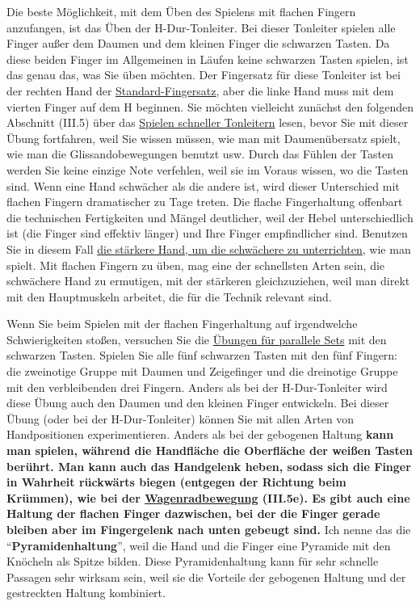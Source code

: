 Die beste Möglichkeit, mit dem Üben des Spielens mit flachen Fingern anzufangen, ist das Üben der H-Dur-Tonleiter.
Bei dieser Tonleiter spielen alle Finger außer dem Daumen und dem kleinen Finger die schwarzen Tasten.
Da diese beiden Finger im Allgemeinen in Läufen keine schwarzen Tasten spielen, ist das genau das, was Sie üben möchten.
Der Fingersatz für diese Tonleiter ist bei der rechten Hand der \hyperref[table]{Standard-Fingersatz}, aber die linke Hand muss mit dem vierten Finger auf dem H beginnen.
Sie möchten vielleicht zunächst den folgenden Abschnitt (III.5) über das \hyperref[c1iii5]{Spielen schneller Tonleitern} lesen, bevor Sie mit dieser Übung fortfahren, weil Sie wissen müssen, wie man mit Daumenübersatz spielt, wie man die Glissandobewegungen benutzt usw.
Durch das Fühlen der Tasten werden Sie keine einzige Note verfehlen, weil sie im Voraus wissen, wo die Tasten sind.
Wenn eine Hand schwächer als die andere ist, wird dieser Unterschied mit flachen Fingern dramatischer zu Tage treten. Die flache Fingerhaltung offenbart die technischen Fertigkeiten und Mängel deutlicher, weil der Hebel unterschiedlich ist (die Finger sind effektiv länger) und Ihre Finger empfindlicher sind.
Benutzen Sie in diesem Fall \hyperref[c1ii20]{die stärkere Hand, um die schwächere zu unterrichten}, wie man spielt.
Mit flachen Fingern zu üben, mag eine der schnellsten Arten sein, die schwächere Hand zu ermutigen, mit der stärkeren gleichzuziehen, weil man direkt mit den Hauptmuskeln arbeitet, die für die Technik relevant sind.

Wenn Sie beim Spielen mit der flachen Fingerhaltung auf irgendwelche Schwierigkeiten stoßen, versuchen Sie die \hyperref[c1iii7b]{Übungen für parallele Sets} mit den schwarzen Tasten.
Spielen Sie alle fünf schwarzen Tasten mit den fünf Fingern: die zweinotige Gruppe mit Daumen und Zeigefinger und die dreinotige Gruppe mit den verbleibenden drei Fingern.
Anders als bei der H-Dur-Tonleiter wird diese Übung auch den Daumen und den kleinen Finger entwickeln.
Bei dieser Übung (oder bei der H-Dur-Tonleiter) können Sie mit allen Arten von Handpositionen experimentieren.
Anders als bei der gebogenen Haltung \textbf{kann man spielen, während die Handfläche die Oberfläche der weißen Tasten berührt.
Man kann auch das Handgelenk heben, sodass sich die Finger in Wahrheit rückwärts biegen (entgegen der Richtung beim Krümmen), wie bei der \hyperref[c1iii5wagen]{Wagenradbewegung} (III.5e).
Es gibt auch eine Haltung der flachen Finger dazwischen, bei der die Finger gerade bleiben aber im Fingergelenk nach unten gebeugt sind.}
Ich nenne das die \enquote{\textbf{Pyramidenhaltung}}, weil die Hand und die Finger eine Pyramide mit den Knöcheln als Spitze bilden.
Diese Pyramidenhaltung kann für sehr schnelle Passagen sehr wirksam sein, weil sie die Vorteile der gebogenen Haltung und der gestreckten Haltung kombiniert.

